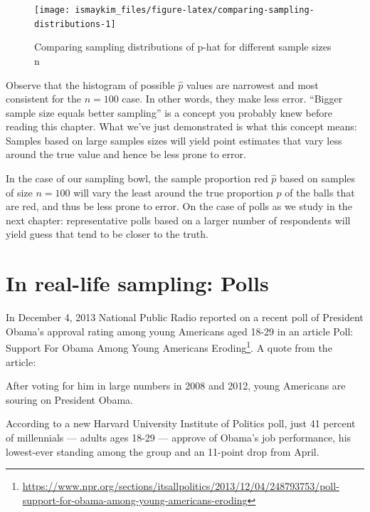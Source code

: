 \documentclass[12pt,]{krantz}
\renewenvironment{quote}{\begin{VF}}{\end{VF}}
\renewcommand{\href}[2]{#2\footnote{\url{#1}}}
\begin{document}
\begin{figure}

{\centering \texttt{[image: ismaykim\_files/figure-latex/comparing-sampling-distributions-1]} 

}

\caption{Comparing sampling distributions of p-hat for different sample sizes n}\label{fig:comparing-sampling-distributions}
\end{figure}

Observe that the histogram of possible \(\widehat{p}\) values are
narrowest and most consistent for the \(n=100\) case. In other words,
they make less error. ``Bigger sample size equals better sampling'' is a
concept you probably knew before reading this chapter. What we've just
demonstrated is what this concept means: Samples based on large samples
sizes will yield point estimates that vary less around the true value
and hence be less prone to error.

In the case of our sampling bowl, the sample proportion red
\(\widehat{p}\) based on samples of size \(n=100\) will vary the least
around the true proportion \(p\) of the balls that are red, and thus be
less prone to error. On the case of polls as we study in the next
chapter: representative polls based on a larger number of respondents
will yield guess that tend to be closer to the truth.

\section{In real-life sampling: Polls}\label{polls}

In December 4, 2013 National Public Radio reported on a recent poll of
President Obama's approval rating among young Americans aged 18-29 in an
article
\href{https://www.npr.org/sections/itsallpolitics/2013/12/04/248793753/poll-support-for-obama-among-young-americans-eroding}{Poll:
Support For Obama Among Young Americans Eroding}. A quote from the
article:

\begin{quote}
After voting for him in large numbers in 2008 and 2012, young Americans
are souring on President Obama.

According to a new Harvard University Institute of Politics poll, just
41 percent of millennials --- adults ages 18-29 --- approve of Obama's
job performance, his lowest-ever standing among the group and an
11-point drop from April.
\end{quote}
\end{document}
